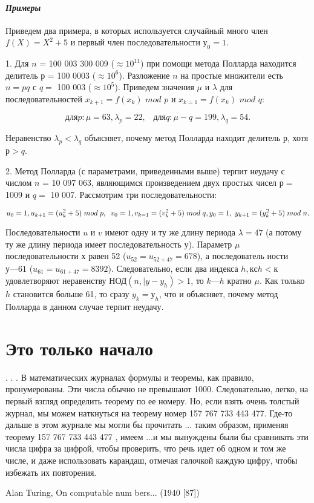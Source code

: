 	\paragraph{{\it Примеры}}
	\noindent
	
	Приведем два примера, в которых используется случайный много	член $f(X )= X^2 + 5$  и первый член последовательности $у_0 = 1$.
	
	1. Для $n$ = 100 003 300 009 ($\approx 10^{11}$) при помощи метода Полларда	находится делитель $р$ = 100 0003 ($\approx 10^6$). Разложение $n$ на простые	множители есть $n = pq$ с $q =$ 100 003 ($\approx 10^5$). Приведем значения $\mu$ и $\lambda$	для последовательностей $x_{k+1} =  f(x_k)$ $mod$ $p$ и $x_{k=1} = f(x_k)$ $mod$ $q$:

	
	\begin{equation}
	\text{для} p: \mu = 63, \lambda_p=22, \;\;\; \text{для} q:\mu-q=199, \lambda_q = 54.
	\end{equation}
	
	\noindent
	Неравенство $\lambda_p	< \lambda_q$ объясняет, почему метод Полларда находит дели­тель $р$, хотя $р > q$.

	
	2. Метод Полларда (с параметрами, приведенными выше) терпит	неудачу с числом $n$ = 10 097 063, являющимся произведением двух простых чисел $р =$ 1009 и $q =$ 10 007. Рассмотрим три последовательности:
	
	\begin{equation}
	u_0 =1, u_{k+1} = (u_{k}^2+5)\;mod\;p, \;\; v_0 = 1, v_{k=1} = (v_{k}^2 + 5)\;mod\;q, \\ y_0=1,\;y_{k+1} = (y_{k}^2 + 5)\; mod \; n.
	\end{equation}
	
	\pagebreak
	Последовательности $u$ и $v$ имеют одну и ту же длину периода $\lambda = 47$	(а потому ту же длину периода имеет последовательность $у$). Параметр $\mu$ последовательности $х$ равен 52 ($u_{52} = u_{52+47} = 678$), а последователь­	ности $у — 61$ ($u_{61} = u_{61+47} = 8392$). Следовательно, если два индекса	$h, к с h < к$ удовлетворяют неравенству НОД$(n, |y-y_h) > 1$, то $k — h$	кратно $\mu$. Как только $h$ становится больше 61, то сразу $y_k = у_h$, что и	объясняет, почему метод Полларда в данном случае терпит неудачу.
	
	\section{Это только начало}
	\epigraph{. . . В математических журналах формулы и теоремы, как правило, пронумерованы. Эти числа обычно не превышают 1000.	Следовательно, легко, на первый взгляд определить теорему по ее номеру. Но, если взять очень толстый журнал, мы можем на­ткнуться на теорему номер 157 767 733 443 477. Где-то дальше в	этом журнале мы могли бы прочитать \guillemotleft ... таким образом, при­меняя теорему 157 767 733 443 477 , имеем ...\guillemotright и мы вынуждены	были бы сравнивать эти числа цифра за цифрой, чтобы проверить, что речь идет об одном и том же числе, и даже использовать карандаш, отмечая галочкой каждую цифру, чтобы избежать их повторения. 
	} {Alan Turing, On computable num bers... (1940 [87])}

